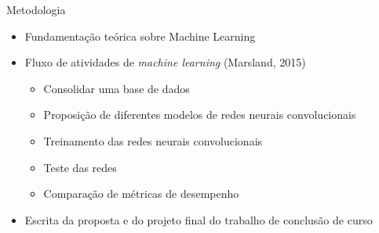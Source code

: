 \begin{frame}{Metodologia}
   \ \  \\[0.1cm]
  \begin{itemize}
  \item Fundamentação teórica sobre Machine Learning
  \item Fluxo de atividades de \emph{machine learning} (Marsland, 2015)
  \begin{itemize}
    \item Consolidar uma base de dados
    \item Proposição de diferentes modelos de redes neurais convolucionais
    \item Treinamento das redes neurais convolucionais
    \item Teste das redes
    \item Comparação de métricas de desempenho
  \end{itemize}
  \item Escrita da proposta e do projeto final do trabalho de conclusão de curso
\end{itemize}
\end{frame}

